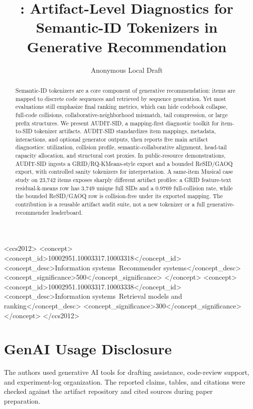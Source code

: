 \documentclass[sigconf,review,anonymous]{acmart}
\title{\tool: Artifact-Level Diagnostics for Semantic-ID Tokenizers in Generative Recommendation}
\author{Anonymous Local Draft}
\affiliation{%
  \institution{Anonymous Institution}
  \country{}
}
\newcommand{\tool}{AUDIT-SID\xspace}
\newcommand{\sid}{SID\xspace}
\begin{document}
\begin{CCSXML}
<ccs2012>
 <concept>
  <concept_id>10002951.10003317.10003318</concept_id>
  <concept_desc>Information systems~Recommender systems</concept_desc>
  <concept_significance>500</concept_significance>
 </concept>
 <concept>
  <concept_id>10002951.10003317.10003338</concept_id>
  <concept_desc>Information systems~Retrieval models and ranking</concept_desc>
  <concept_significance>300</concept_significance>
 </concept>
</ccs2012>
\end{CCSXML}


\begin{abstract}
Semantic-ID tokenizers are a core component of generative recommendation:
items are mapped to discrete code sequences and retrieved by sequence
generation. Yet most evaluations still emphasize final ranking metrics, which
can hide codebook collapse, full-code collisions, collaborative-neighborhood
mismatch, tail compression, or large prefix structures. We present
\tool, a mapping-first diagnostic toolkit for item-to-\sid tokenizer
artifacts. \tool standardizes item mappings, metadata, interactions, and
optional generator outputs, then reports five main artifact diagnostics:
utilization, collision profile, semantic-collaborative alignment, head-tail
capacity allocation, and structural cost proxies. In public-resource
demonstrations, \tool ingests a GRID/RQ-KMeans-style export and a bounded
ReSID/GAOQ export, with controlled sanity tokenizers for interpretation. A
same-item Musical case study on 23,742 items exposes sharply different artifact profiles: a
GRID feature-text residual-k-means row has 3,749 unique full \sid{}s and a
0.9769 full-collision rate, while the bounded ReSID/GAOQ row is
collision-free under its exported mapping. The contribution is a reusable
artifact audit suite, not a new tokenizer or a full generative-recommender
leaderboard.
\end{abstract}

\maketitle









\section*{GenAI Usage Disclosure}
The authors used generative AI tools for drafting assistance, code-review
support, and experiment-log organization. The reported claims, tables, and
citations were checked against the artifact repository and cited sources during
paper preparation.
\end{document}

